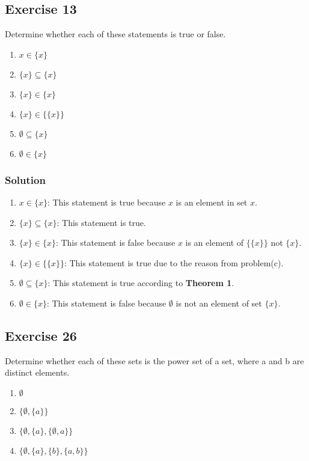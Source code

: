 \documentclass{article}
\theoremstyle{mytheoremstyle}
\theoremstyle{mytheoremstyle}
\theoremstyle{myproblemstyle}
\begin{document}
    \subsection*{Exercise 13}
        Determine whether each of these statements is true or false.
        \begin{enumerate} [label = (\alph*)]
            \item \(x \in \{x\}\)
            \item \(\{x\} \subseteq \{x\}\)
            \item \(\{x\} \in \{x\}\)
            \item \(\{x\} \in \{\{x\}\}\)
            \item \(\emptyset \subseteq \{x\}\)
            \item \(\emptyset \in \{x\}\)
        \end{enumerate}
    \subsubsection*{Solution}
        \begin{enumerate} [label = (\alph*)]
            \item \(x \in \{x\}\): This statement is true because \(x\) is an element in set
            \(x\).
            \item \(\{x\} \subseteq \{x\}\): This statement is true.
            \item \(\{x\} \in \{x\}\): This statement is false because \(x\) is an element of 
            \(\{\{x\}\}\) not \(\{x\}\).
            \item \(\{x\} \in \{\{x\}\}\): This statement is true due to the reason from problem(c).
            \item \(\emptyset \subseteq \{x\}\): This statement is true according to \textbf{Theorem 1}.
            \item \(\emptyset \in \{x\}\): This statement is false because \(\emptyset\) is not 
            an element of set \(\{x\}\).
        \end{enumerate}
    \subsection*{Exercise 26}
        Determine whether each of these sets is the power set of 
        a set, where a and b are distinct elements.
        \begin{enumerate} [label = (\alph*)]
            \item \(\emptyset\)
            \item \(\{\emptyset, \{a\}\}\)
            \item \(\{\emptyset, \{a\}, \{\emptyset, a\}\}\)
            \item \(\{\emptyset, \{a\}, \{b\}, \{a, b\}\}\)
        \end{enumerate}
\end{document}
